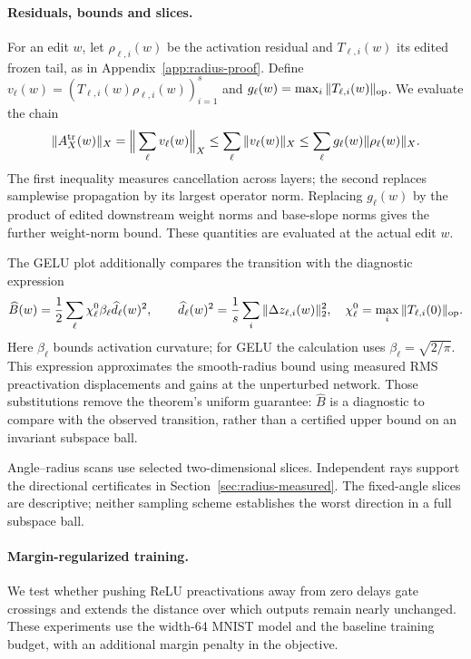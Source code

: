 \paragraph{Residuals, bounds and slices.}
For an edit $w$, let $\rho_{\ell,i}(w)$ be the activation residual and $T_{\ell,i}(w)$ its edited frozen tail, as in Appendix~\ref{app:radius-proof}. Define $v_\ell(w)=(T_{\ell,i}(w)\rho_{\ell,i}(w))_{i=1}^s$ and $g_\ell(w)=\max_i\|T_{\ell,i}(w)\|_{\rm op}$. We evaluate the chain
\[
 \|A_X^{\rm tr}(w)\|_X
 =\Big\|\sum_\ell v_\ell(w)\Big\|_X
 \le\sum_\ell\|v_\ell(w)\|_X
 \le\sum_\ell g_\ell(w)\|\rho_\ell(w)\|_X.
\]
The first inequality measures cancellation across layers; the second replaces samplewise propagation by its largest operator norm. Replacing $g_\ell(w)$ by the product of edited downstream weight norms and base-slope norms gives the further weight-norm bound. These quantities are evaluated at the actual edit $w$.

The GELU plot additionally compares the transition with the diagnostic expression
\[
 \widehat B(w)=\frac12\sum_\ell \chi_\ell^0\beta_\ell
          \widehat d_\ell(w)^2,\qquad
 \widehat d_\ell(w)^2=\frac1s\sum_i\|\Delta z_{\ell,i}(w)\|_2^2,
 \quad \chi_\ell^0=\max_i\|T_{\ell,i}(0)\|_{\rm op}.
\]
Here $\beta_\ell$ bounds activation curvature; for GELU the calculation uses $\beta_\ell=\sqrt{2/\pi}$. This expression approximates the smooth-radius bound using measured RMS preactivation displacements and gains at the unperturbed network. Those substitutions remove the theorem's uniform guarantee: $\widehat B$ is a diagnostic to compare with the observed transition, rather than a certified upper bound on an invariant subspace ball.

Angle--radius scans use selected two-dimensional slices. Independent rays support the directional certificates in Section~\ref{sec:radius-measured}. The fixed-angle slices are descriptive; neither sampling scheme establishes the worst direction in a full subspace ball.

\paragraph{Margin-regularized training.}\label{app:methods-margin}
We test whether pushing ReLU preactivations away from zero delays gate crossings and extends the distance over which outputs remain nearly unchanged. These experiments use the width-64 MNIST model and the baseline training budget, with an additional margin penalty in the objective.

